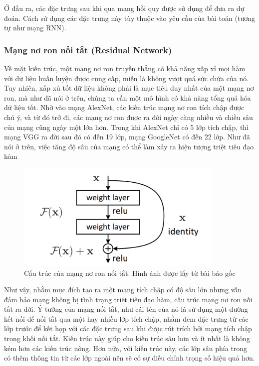 Ở đầu ra, các đặc trưng sau khi qua mạng hồi quy được sử dụng để đưa ra dự đoán. Cách sử dụng các đặc trưng này tùy thuộc vào yêu cầu của bài toán (tương tự như mạng RNN).

\subsubsection{Mạng nơ ron nối tắt (Residual Network)}

Về mặt kiến trúc, một mạng nơ ron truyền thẳng có khả năng xấp xỉ mọi hàm với dữ liệu huấn luyện được cung cấp, miễn là không vượt quá sức chứa của nó. Tuy nhiên, xấp xủ tốt dữ liệu không phải là mục tiêu duy nhất của một mạng nơ ron, mà như đã nói ở trên, chúng ta cần một mô hình có khả năng tổng quá hóa dữ liệu tốt. Nhờ vào mạng AlexNet, các kiến trúc mạng nơ ron tích chập được chú ý, và từ đó trở đi, các mạng nơ ron được ra đời ngày càng nhiều và chiều sâu của mạng cũng ngày một lớn hơn. Trong khi AlexNet chỉ có 5 lớp tích chập, thì mạng VGG ra đời sau đó có đến 19 lớp, mạng GoogleNet có đến 22 lớp. Như đã nói ở trên, việc tăng độ sâu của mạng có thể làm xảy ra hiện tượng triệt tiêu đạo hàm

\begin{figure}[H]
    \centering
    \includegraphics[width=10cm]{./content/materials/residual_orig.png}
    \caption{Cấu trúc của mạng nơ ron nối tắt. Hình ảnh được lấy từ bài báo gốc \cite{residual}}
\end{figure}

Như vậy, nhằm mục đích tạo ra một mạng tích chập có độ sâu lớn nhưng vẫn đảm bảo mạng không bị tình trạng triệt tiêu đạo hàm, cấu trúc mạng nơ ron nối tắt ra đời. Ý tưởng của mạng nối tắt, như cái tên của nó là sử dụng một đường kết nối để nối tắt qua một hay nhiều lớp tích chập, nhằm đem đặc trưng từ các lớp trước để kết họp với các đặc trưng sau khi được rút trích bởi mạng tích chập trong khối nối tắt. Kiến trúc này giúp cho kiến trúc sâu hơn và ít nhất là không kém hơn các kiến trúc nông. Hơn nữa, với kiến trúc này, các lớp sâu phía trong có thêm thông tin từ các lớp ngoài nên sẽ có sự điều chỉnh trọng số hiệu quả hơn.

